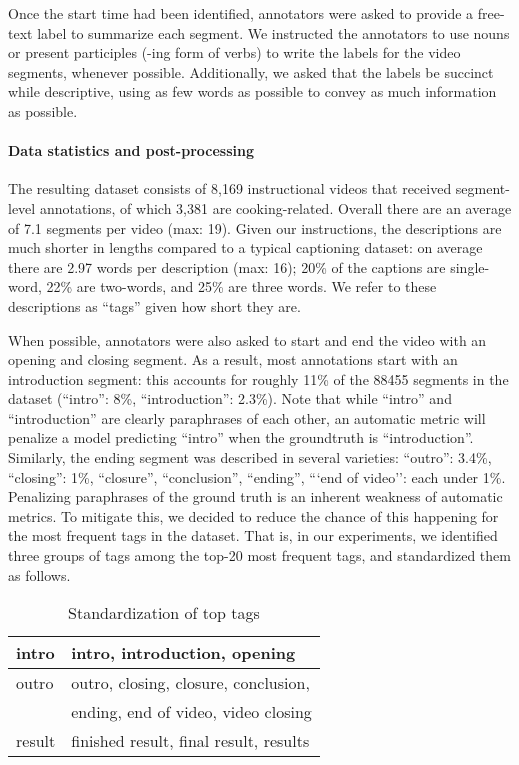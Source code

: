 \documentclass[11pt,a4paper]{article}
\begin{document}
Once the start time had been identified, annotators were asked to provide a free-text label to summarize each segment.   We instructed the annotators to use nouns or present participles (-ing form of verbs) to write the labels for the video segments, whenever possible.  Additionally, we asked that the labels be succinct while descriptive, using as few words as possible to convey as much information as possible.

\paragraph{Data statistics and post-processing}
The resulting dataset consists of 8,169 instructional videos that received segment-level annotations, of which 3,381 are cooking-related.
Overall there are an average of 7.1 segments per video (max: 19). Given our instructions, the descriptions are much shorter in lengths compared to a typical captioning dataset:  on average there are 2.97 words per description (max: 16);  20\% of the captions are single-word, 22\% are two-words, and 25\% are three words.  We refer to these descriptions as ``tags'' given how short they are.
 
When possible, annotators were also asked to start and end the video with an opening and closing segment.
As a result, most annotations start with an introduction segment: this accounts for roughly 11\% of the 88455 segments in the dataset (``intro'': 8\%, ``introduction'': 2.3\%).  Note that while ``intro'' and ``introduction'' are clearly paraphrases of each other, an automatic metric will penalize a model predicting ``intro'' when the groundtruth is ``introduction''.  
Similarly, the ending segment was described in several varieties: ``outro'': 3.4\%, ``closing'': 1\%, ``closure'', ``conclusion'', ``ending'', ```end of video'': each under 1\%.
Penalizing paraphrases of the ground truth is an inherent weakness of automatic metrics.  To mitigate this, we decided to reduce the chance of this happening for the most frequent tags in the dataset.  That is, in our experiments, we identified three groups of tags among the top-20 most frequent tags, and standardized them as follows.
\begin{table}[h!]
    \centering
    \begin{tabular}{|l|l|} \hline 
intro     &  intro, introduction, opening \\ \hline
outro     &  outro, closing, closure, conclusion, \\
          &  ending, end of video, video closing \\ \hline 
result    &  finished result, final result, results \\ \hline
\end{tabular}
    \caption{Standardization of top tags}
    \label{tab:tag_normalization}
\end{table}
\end{document}
